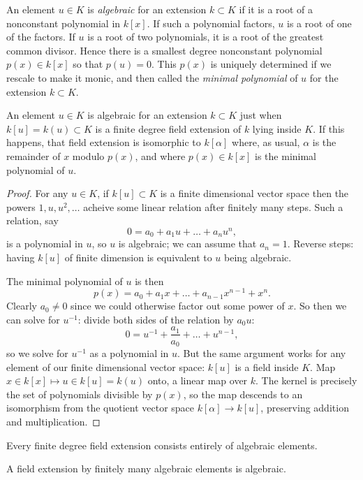 An element \(u\in K\) is \emph{algebraic} for an extension \(k\subset K\) if it is a root of a nonconstant polynomial in \(k[x]\).
If such a polynomial factors, \(u\) is a root of one of the factors.
If \(u\) is a root of two polynomials, it is a root of the greatest common divisor.
Hence there is a smallest degree nonconstant polynomial \(p(x)\in k[x]\) so that \(p(u)=0\).
This \(p(x)\) is uniquely determined if we rescale to make it monic, and then called the \emph{minimal polynomial} of \(u\) for the extension \(k\subset K\).
\begin{corollary}
An element \(u\in K\) is algebraic for an extension \(k\subset K\) just when \(k[u]=k(u)\subset K\) is a finite degree field extension of \(k\) lying inside \(K\).
If this happens, that field extension is isomorphic to \(k[\alpha]\) where, as usual, \(\alpha\) is the remainder of \(x\) modulo \(p(x)\), and where \(p(x)\in k[x]\) is the minimal polynomial of \(u\).
\end{corollary}
\begin{proof}
For any \(u\in K\), if \(k[u]\subset K\) is a finite dimensional vector space then the powers \(1,u,u^2,\dots\) acheive some linear relation after finitely many steps.
Such a relation, say 
\[
0=a_0+a_1u+\dots+a_nu^n,
\] 
is a polynomial in \(u\), so \(u\) is algebraic; we can assume that \(a_n=1\).
Reverse steps: having \(k[u]\) of finite dimension is equivalent to \(u\) being algebraic.

The minimal polynomial of \(u\) is then
\[
p(x)=a_0+a_1x+\dots+a_{n-1}x^{n-1}+x^n.
\]
Clearly \(a_0\ne 0\) since we could otherwise factor out some power of \(x\).
So then we can solve for \(u^{-1}\): divide both sides of the relation by \(a_0u\):
\[
0 = u^{-1}+\frac{a_1}{a_0}+\dots+u^{n-1},
\]
so we solve for \(u^{-1}\) as a polynomial in \(u\).
But the same argument works for any element of our finite dimensional vector space: \(k[u]\) is a field inside \(K\).
Map \(x\in k[x]\mapsto u\in k[u]=k(u)\) onto, a linear map over \(k\).
The kernel is precisely the set of polynomials divisible by \(p(x)\), so the map descends to an isomorphism from the quotient vector space \(k[\alpha]\to k[u]\), preserving addition and multiplication.
\end{proof}
\begin{corollary}
Every finite degree field extension consists entirely of algebraic elements.
\end{corollary}
\begin{corollary}
A field extension by finitely many algebraic elements is algebraic.
\end{corollary}

